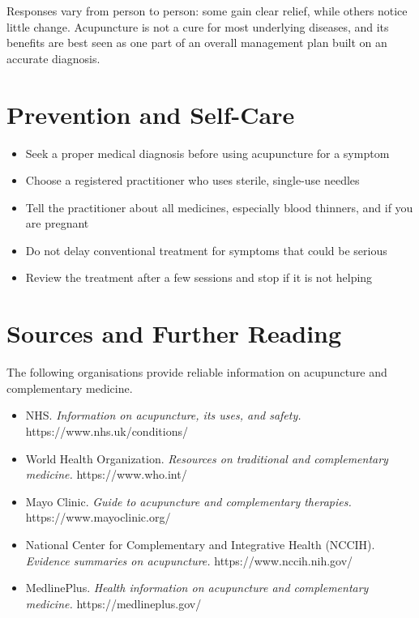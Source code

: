 Responses vary from person to person: some gain clear relief, while others notice little change. Acupuncture is not a cure for most underlying diseases, and its benefits are best seen as one part of an overall management plan built on an accurate diagnosis.

\section*{Prevention and Self-Care}
\begin{itemize}
    \item Seek a proper medical diagnosis before using acupuncture for a symptom
    \item Choose a registered practitioner who uses sterile, single-use needles
    \item Tell the practitioner about all medicines, especially blood thinners, and if you are pregnant
    \item Do not delay conventional treatment for symptoms that could be serious
    \item Review the treatment after a few sessions and stop if it is not helping
\end{itemize}

\section*{Sources and Further Reading}
The following organisations provide reliable information on acupuncture and complementary medicine.

\begin{itemize}
    \item NHS. \textit{Information on acupuncture, its uses, and safety.} https://www.nhs.uk/conditions/
    \item World Health Organization. \textit{Resources on traditional and complementary medicine.} https://www.who.int/
    \item Mayo Clinic. \textit{Guide to acupuncture and complementary therapies.} https://www.mayoclinic.org/
    \item National Center for Complementary and Integrative Health (NCCIH). \textit{Evidence summaries on acupuncture.} https://www.nccih.nih.gov/
    \item MedlinePlus. \textit{Health information on acupuncture and complementary medicine.} https://medlineplus.gov/
\end{itemize}

